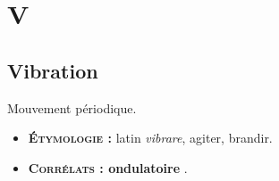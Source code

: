 \chapter{V}
%
\section{Vibration}

Mouvement périodique.

{\footnotesize
\begin{itemize}[leftmargin=1cm, label=, itemsep=1pt]
\item {\bf \textsc{Étymologie} :} latin {\it vibrare}, agiter, brandir.
\item {\bf \textsc{Corrélats} : ondulatoire} .
\end{itemize}
}
